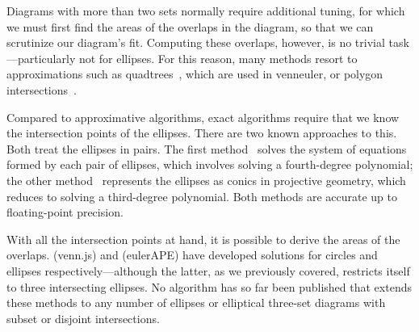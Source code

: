 \documentclass[
  oneside,
  openany,
  numbers=noendperiod,
  parskip=half,
  bibliography=totoc
]{scrbook}\usepackage[]{graphicx}\usepackage{xcolor}
\newcommand{\pkg}[1]{{\fontseries{b}\selectfont #1}}
\begin{document}
Diagrams with more than two sets normally require additional tuning, for which
we must first find the areas of the overlaps in the diagram,
so that we can scrutinize our diagram's fit. Computing these overlaps, however, is no trivial
task---particularly not for ellipses. For this reason, many methods resort to
approximations such as quadtrees~\citep{Wilkinson_2012}, which are used
in \pkg{venneuler}, or polygon
intersections~\citep{Kestler_2008}.

Compared to approximative algorithms, exact algorithms require that we
know the intersection points of the ellipses. There are
two known approaches to this. Both treat the ellipses in pairs. The first
method~\citep{Eberly_2016}
solves the system of equations formed by each pair of
ellipses, which involves solving a fourth-degree
polynomial; the other method~\citep{Richter-Gebert_2011} represents the ellipses as
conics in projective geometry, which reduces to solving a third-degree polynomial.
Both methods are accurate up to floating-point precision.

With all the intersection points at hand, it is possible to derive the areas
of the overlaps. \citet{Frederickson_2016} (\pkg{venn.js}) and
\citet{Micallef_2014a} (\pkg{eulerAPE}) have developed solutions for circles
and ellipses respectively---although the latter, as we previously covered,
restricts itself to three intersecting ellipses. No algorithm has so far been
published that extends these methods to any number of ellipses or elliptical
three-set diagrams with subset or disjoint intersections.
\end{document}
